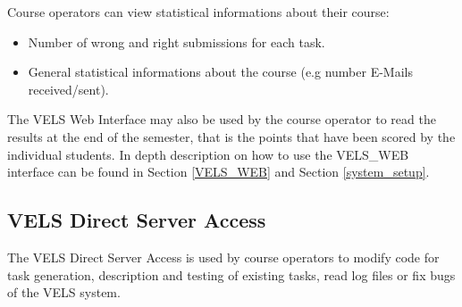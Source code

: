 Course operators can view statistical informations about their course:
\begin{itemize}
\item Number of wrong and right submissions for each task.
\item General statistical informations about the course (e.g number E-Mails received/sent).
\end{itemize}

The VELS Web Interface may also be used by the course operator to read the results at the end of the semester,
that is the points that have been scored by the individual students. In depth description on how to use the
VELS\_WEB interface can be found in Section \ref{VELS_WEB} and Section \ref{system_setup}.


\subsection{VELS Direct Server Access}\label{directserveraccess}
The VELS Direct Server Access is used by course operators to  modify code for task
generation, description and testing of existing tasks, read log files or fix bugs of the VELS system.
